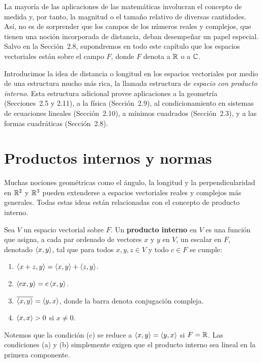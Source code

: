 \documentclass[12pt,a4paper]{book}
\begin{document}
    La mayoría de las aplicaciones de las matemáticas involucran el concepto de medida y, por tanto, la magnitud o el tamaño relativo de diversas cantidades. Así, no es de sorprender que los campos de los números reales y complejos, que tienen una noción incorporada de distancia, deban desempeñar un papel especial. Salvo en la Sección~2.8, supondremos en todo este capítulo que los espacios vectoriales están sobre el campo $F$, donde $F$ denota a $\mathbb{R}$ o a $\mathbb{C}$.

    Introducimos la idea de distancia o longitud en los espacios vectoriales por medio de una estructura mucho más rica, la llamada estructura de \textit{espacio con producto interno}. Esta estructura adicional provee aplicaciones a la geometría (Secciones~2.5 y 2.11), a la física (Sección~2.9), al condicionamiento en sistemas de ecuaciones lineales (Sección~2.10), a mínimos cuadrados (Sección~2.3), y a las formas cuadráticas (Sección~2.8).

    \section{Productos internos y normas}

    Muchas nociones geométricas como el ángulo, la longitud y la perpendicularidad en $\mathbb{R}^2$ y $\mathbb{R}^3$ pueden extenderse a espacios vectoriales reales y complejos más generales. Todas estas ideas están relacionadas con el concepto de producto interno.

    \begin{definicion}
        Sea $V$ un espacio vectorial sobre $F$. Un \textbf{producto interno} en $V$ es una función que asigna, a cada par ordenado de vectores $x$ y $y$ en $V$, un escalar en $F$, denotado $\left\langle x, y \right\rangle$, tal que para todos $x,y,z\in V$ y todo $c\in F$ se cumple:
        \begin{enumerate}[label=(\alph*)]
            \item $\left\langle x+z, y \right\rangle=\left\langle x, y \right\rangle+\left\langle z, y \right\rangle$.
            \item $\left\langle cx, y \right\rangle=c\left\langle x, y \right\rangle$.
            \item $\overline{\left\langle x, y \right\rangle}=\left\langle y, x \right\rangle$, donde la barra denota conjugación compleja.
            \item $\left\langle x, x \right\rangle>0$ si $x\neq 0$.
        \end{enumerate}
    \end{definicion}

    Notemos que la condición (c) se reduce a $\left\langle x, y \right\rangle=\left\langle y, x \right\rangle$ si $F=\mathbb{R}$. Las condiciones (a) y (b) simplemente exigen que el producto interno sea lineal en la primera componente.
\end{document}
